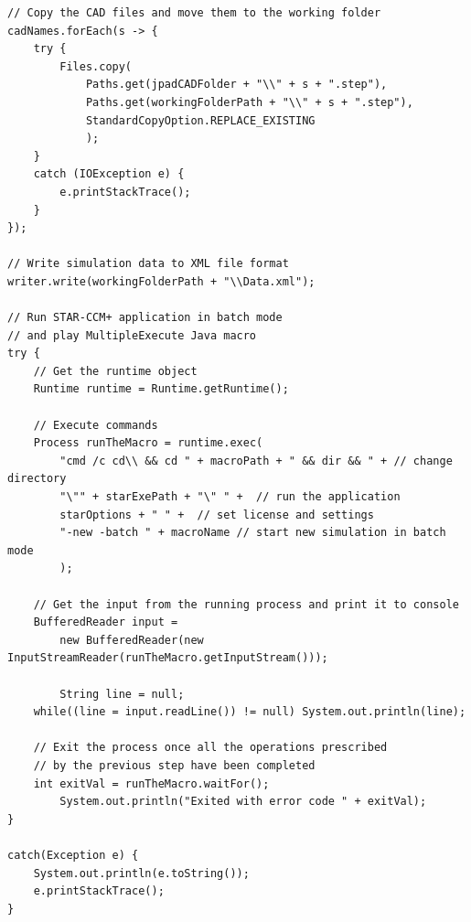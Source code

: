 \begin{lstlisting}[caption={Launching class final steps}, captionpos=b, tabsize=2, label={lst:RunningSTAR}]
// Copy the CAD files and move them to the working folder
cadNames.forEach(s -> {
	try { 
		Files.copy(		
			Paths.get(jpadCADFolder + "\\" + s + ".step"), 
			Paths.get(workingFolderPath + "\\" + s + ".step"), 
			StandardCopyOption.REPLACE_EXISTING
			);
	} 
	catch (IOException e) {
		e.printStackTrace();
	}
});

// Write simulation data to XML file format		
writer.write(workingFolderPath + "\\Data.xml");
		
// Run STAR-CCM+ application in batch mode 
// and play MultipleExecute Java macro
try {
	// Get the runtime object
	Runtime runtime = Runtime.getRuntime();
		
	// Execute commands	
	Process runTheMacro = runtime.exec(
		"cmd /c cd\\ && cd " + macroPath + " && dir && " + // change directory
		"\"" + starExePath + "\" " +  // run the application
		starOptions + " " +  // set license and settings
		"-new -batch " + macroName // start new simulation in batch mode
		); 
	
	// Get the input from the running process and print it to console		         
	BufferedReader input = 
		new BufferedReader(new InputStreamReader(runTheMacro.getInputStream()));
            
        String line = null;		
	while((line = input.readLine()) != null) System.out.println(line);
		
	// Exit the process once all the operations prescribed  
	// by the previous step have been completed	
	int exitVal = runTheMacro.waitFor();
        System.out.println("Exited with error code " + exitVal);
}
		
catch(Exception e) {
	System.out.println(e.toString());
	e.printStackTrace();
}
\end{lstlisting}
%

